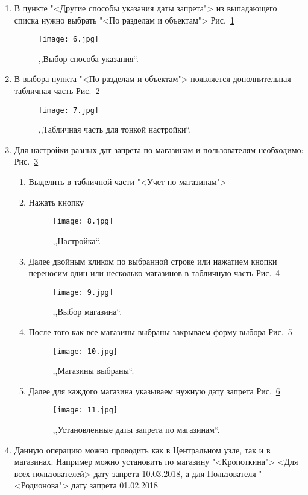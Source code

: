 \begin{enumerate}
	\item В пункте "<Другие способы указания даты запрета"> из выпадающего списка нужно выбрать "<По разделам и объектам"> Рис.~\ref{ris:6.jpg}
	\begin{figure}[H]
		\texttt{[image: 6.jpg]}
		\caption{,,Выбор способа указания``.}
		\label{ris:6.jpg}
	\end{figure}

	\item В выбора пункта "<По разделам и объектам"> появляется дополнительная табличная часть Рис.~\ref{ris:7.jpg}
	\begin{figure}[H]
		\texttt{[image: 7.jpg]}
		\caption{,,Табличная часть для тонкой настройки``.}
		\label{ris:7.jpg}
	\end{figure}

	\item Для настройки разных дат запрета по магазинам и пользователям необходимо: Рис.~\ref{ris:8.jpg}
	\begin{enumerate}	
		\item Выделить в табличной части "<Учет по магазинам">
		\item Нажать кнопку 
			\begin{figure}[H]
				\texttt{[image: 8.jpg]}
				\caption{,,Настройка``.}
				\label{ris:8.jpg}
		\end{figure}
		\item Далее двойным кликом по выбранной строке или нажатием кнопки  переносим один или несколько магазинов в табличную часть Рис.~\ref{ris:9.jpg}
		\begin{figure}[H]
			\texttt{[image: 9.jpg]}
			\caption{,,Выбор магазина``.}
			\label{ris:9.jpg}
		\end{figure}
		\item После того как все магазины выбраны закрываем форму выбора Рис.~\ref{ris:10.jpg}
		\begin{figure}[H]
			\texttt{[image: 10.jpg]}
			\caption{,,Магазины выбраны``.}
			\label{ris:10.jpg}
		\end{figure}
	\item Далее для каждого магазина указываем нужную дату запрета Рис.~\ref{ris:11.jpg}
		\begin{figure}[H]
			\texttt{[image: 11.jpg]}
			\caption{,,Установленные даты запрета по магазинам``.}
			\label{ris:11.jpg}
		\end{figure}
	\end{enumerate}

	\item Данную операцию можно проводить как в Центральном узле, так и в магазинах. Например можно установить по магазину "<Кропоткина"> <Для всех пользователей> дату запрета 10.03.2018, а для Пользователя "<Родионова"> дату запрета 01.02.2018

	\end{enumerate}

